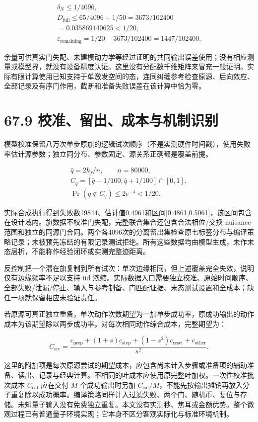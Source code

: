 \documentclass[
  11pt,
  oneside]{book}
\begin{document}
\[
\begin{gathered}
\delta_N\le1/4096,\\
D_{\mathrm{full}}\le65/4096+1/50
=3673/102400\\
=0.035869140625<1/20,\\
\varepsilon_{\mathrm{remaining}}=1/20-3673/102400=1447/102400.
\end{gathered}
\]

余量可供真实门失配、未建模动力学等经过证明的共同输出误差使用；没有相应测量或模型界，就没有设备精度认证。这里没有分配数千维矩阵来冒充一般证明。实际有限计算使用已知支持于单激发空间的态，连同纠缠参考检查原源、后向效应、全部记录及有序门作用，截断和准备失败误差在该计算中恰为零。

\section{67.9 校准、留出、成本与机制识别}

模型校准保留八万次单步原旗的逻辑试次顺序（不是实测硬件时间戳），使用失败率估计源参数；独立同分布、参数固定、源关系正确都是覆盖前提。

\[
\begin{gathered}
\widehat q=2k_f/n,\qquad n=80000,\\
C_q=[\widehat q-1/100,\widehat q+1/100]\cap[0,1],\\
\Pr(q\notin C_q)\le2e^{-4}<1/20.
\end{gathered}
\]

实际合成执行得到失败数19844、估计值0.4961和区间{[}0.4861,0.5061{]}，该区间包含在设计域内。旗数据不校准门失配，完整联合集合还包含合法相位/交换
nuisance
范围和独立的同源门合同。两个各4096次的分离留出集检查原七标签分布与编译策略记录；未被预先冻结的有限记录测试拒绝。所有这些数据均由模型生成，未作末态层析，不能称作经验闭环或实测完整迹距离。

反控制把一个潜在旗复制到所有试次：单次边缘相同，但上述覆盖完全失效，说明仅有边缘频率不足以支持
iid
浓缩。实际数据入口需要独立校准、原始时间顺序、全部失败/泄漏/停止、输入与参考制备、门匹配证据、末态测试设置和全成本；缺任一项就保留相应未验证责任。

若原源可真正独立重备，单次动作次数期望为一加单步成功率，原成功输出的动作成本为该期望除以两步成功率。对每次相同动作综合成本，完整期望为：

\[
C_{\mathrm{src}}=
\frac{c_{\mathrm{prep}}+(1+s)c_{\mathrm{step}}+(1-s^2)c_{\mathrm{reset}}+c_{\mathrm{other}}}{s^2}.
\]

这里的附加项是每次原源尝试的期望成本，应包含尚未计入步骤或准备项的辅助准备、读出、记录与经典计算。不相同的叶成本应使用原完整叶加权。一次性校准批次成本
\(C_{\mathrm{cal}}\) 应在交付 \(M\) 个成功输出时另加
\(C_{\mathrm{cal}}/M\)，不能先按输出摊销再放入分子重复除以成功概率。编译策略同样计入过滤失败、两个门、随机币、复位与存储。未知量子输入没有免费独立重复。本文没有实测秒、焦耳或金额优势。整个微观过程已有普通量子环境实现；它本身不区分客观实际化与标准环境机制。
\end{document}
